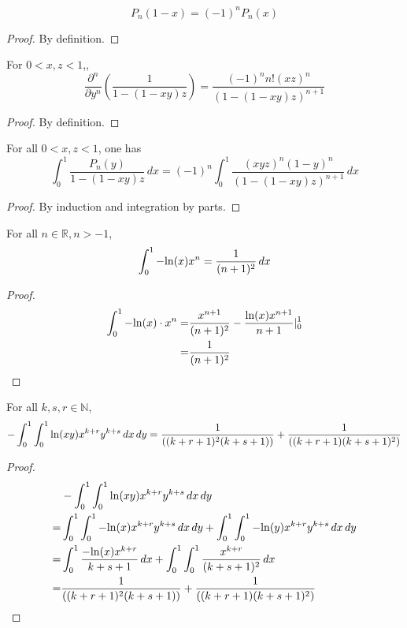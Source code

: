 \begin{lemma}\label{shiftedLegendre_eval_symm}
    \[ P_n(1-x)=(-1)^nP_n(x) \]
\end{lemma}
\begin{proof}
    \leanok
    By definition.
\end{proof}

\begin{lemma}\label{frac_partial_n}
    For $ 0 < x, z < 1$,,
    \[ \frac{\partial^n}{\partial y^n}(\frac{1}{1 - (1-xy)z}) = \frac{(-1)^nn!(xz)^n}{(1 - (1-xy)z)^{n+1}} \]
\end{lemma}
\begin{proof}
    \leanok
    By definition.
\end{proof}

\begin{lemma}\label{Legendre_poly_mul_frac_integral}
    For all $ 0 < x, z < 1$, one has
    \[ \int_{0}^{1}\frac{P_n(y)}{1 - (1-xy)z} \, dx =(-1)^n \int_{0}^{1} \frac{(xyz)^n(1-y)^n}{(1 - (1-xy)z)^{n+1}} \, dx \]
\end{lemma}
\begin{proof}
    \leanok
    By induction and integration by parts.
\end{proof}

\begin{lemma}\label{log_pow_integral}
    For all $n \in \mathbb{R}, n > -1$,
    \[ \int_{0}^{1} -{\rm ln}(x) x^n = \frac{1}{(n + 1)^2} \, dx \]
\end{lemma}
\begin{proof}
    \leanok
    \begin{align*}
        \int_{0}^{1} -{\rm ln}(x)\cdot x^n =& \frac{x^{n+1}}{(n+1)^2} - \frac{{\rm ln}(x) x^{n+1}}{n+1} |_0^1 \\
        =& \frac{1}{(n+1)^2}
    \end{align*}
\end{proof}

\begin{lemma}\label{J_rs_eq_sum_aux}
    For all $k,s,r \in \mathbb{N}$,
    \[-\int_{0}^{1}\int_{0}^{1} {\rm ln}(xy)x^{k+r}y^{k+s}\, dx \, dy = \frac{1}{((k+r+1)^2(k+s+1))}+\frac{1}{((k+r+1)(k+s+1)^2)}\]
\end{lemma}
\begin{proof}
    \leanok
    \begin{align*}
         &-\int_{0}^{1}\int_{0}^{1} {\rm ln}(xy)x^{k+r}y^{k+s}\, dx \, dy \\
        =& \int_{0}^{1}\int_{0}^{1} -{\rm ln}(x)x^{k+r}y^{k+s}\, dx \, dy + \int_{0}^{1}\int_{0}^{1} -{\rm ln}(y)x^{k+r}y^{k+s}\, dx \, dy \\
        =& \int_{0}^{1} \frac{-{\rm ln}(x)x^{k+r}}{k+s+1} \, dx + \int_{0}^{1}\int_{0}^{1} \frac{x^{k+r}}{(k+s+1)^2}\, dx\\
        =& \frac{1}{((k+r+1)^2(k+s+1))} + \frac{1}{((k+r+1)(k+s+1)^2)}
    \end{align*}
\end{proof}

